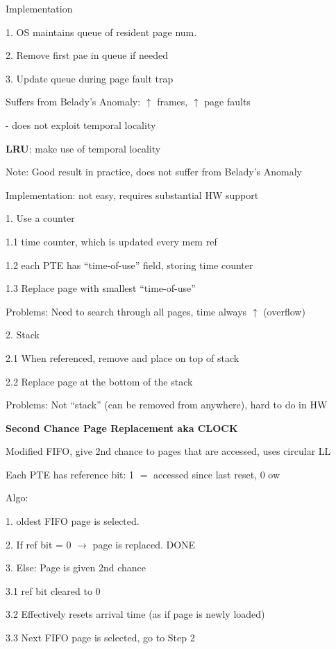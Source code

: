 \documentclass[10pt, a4paper]{article}
\newcommand{\blue}[1]{{\color{MidnightBlue}#1}}
\newcommand{\red}[1]{{\color{red}#1}}
\newcommand{\tab}[0]{\hspace*{2mm}}
\begin{document}
\begin{multicols*}{3}
		Implementation

		1. OS maintains queue of resident page num.

		2. Remove first pae in queue if needed

		3. Update queue during page fault trap

		\red{Suffers from Belady's Anomaly}: $\uparrow$ frames, $\uparrow$ page faults

		\tab{} - does not exploit \blue{temporal locality}

		\textbf{LRU}: make use of \blue{temporal locality}

		Note: Good result in practice, does not suffer from Belady's Anomaly

		Implementation: \red{not easy}, requires \blue{substantial HW support}

		1. Use a counter
		
		\tab{} 1.1 time counter, which is updated every mem ref

		\tab{} 1.2 each PTE has ``time-of-use'' field, storing time counter

		\tab{} 1.3 Replace page with smallest ``time-of-use''

		\red{Problems}: Need to search through all pages, time always $\uparrow$ (overflow)

		2. Stack

		\tab{} 2.1 When referenced, remove and place on top of stack

		\tab{} 2.2 Replace page at the bottom of the stack

		\red{Problems}: Not ``stack'' (can be removed from anywhere), hard to do in HW

		\textbf{Second Chance Page Replacement aka CLOCK}

		Modified FIFO, give 2nd chance to pages that are accessed, uses \red{circular LL}

		Each PTE has \red{reference bit}: 1 $=$ accessed since last reset, 0 ow

		Algo:

		1. oldest FIFO page is selected.

		2. If ref bit = 0 $\rightarrow$ page is replaced. \blue{DONE}

		3. Else: Page is given 2nd chance

		\tab{} 3.1 ref bit cleared to 0

		\tab{} 3.2 Effectively resets arrival time (as if page is newly loaded)

		\tab{} 3.3 Next FIFO page is selected, go to Step 2


\end{multicols*}
\end{document}
